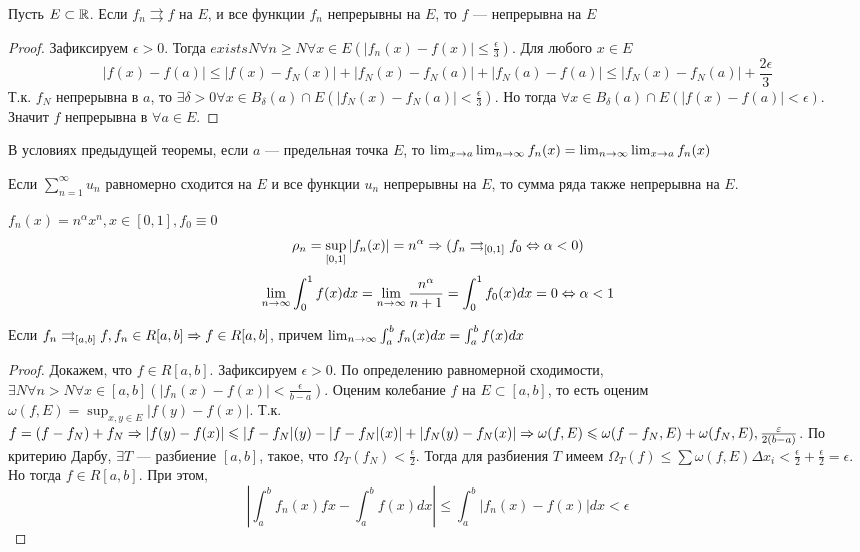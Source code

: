 \begin{theorem}
    Пусть \(E \subset \mathbb{R}\). Если \(f_n \rightrightarrows f\) на \(E\), и все функции \(f_n\) непрерывны на \(E\), то \(f\) --- непрерывна на \(E\)
\end{theorem}
\begin{proof}
    Зафиксируем \(\epsilon > 0\). Тогда \(exists N \forall n \ge N \forall x \in E \left(|f_n(x) - f(x)| \le \frac{\epsilon}{3}\right)\). Для любого \(x \in E\)
    \[|f(x) - f(a)| \le |f(x) - f_N(x)| + |f_N(x) - f_N(a)| + |f_N(a) - f(a)| \le |f_N(x) - f_N(a)| + \frac{2\epsilon}{3}\]
    Т.к. \(f_N\) непрерывна в \(a\), то \(\exists \delta > 0 \forall x \in B_\delta(a) \cap E \left(|f_N(x) - f_N(a)| < \frac{\epsilon}{3}\right)\). Но тогда \(\forall x \in B_\delta(a) \cap E (|f(x) - f(a)| < \epsilon)\). Значит \(f\) непрерывна в \(\forall a \in E\).
\end{proof}

\begin{note}
    В условиях предыдущей теоремы, если \(a\) --- предельная точка \(E\), то \(\lim_{x \rightarrow a}\lim_{n \rightarrow \infty}f_n(x) = \lim_{n \rightarrow \infty}\lim_{x \rightarrow a}f_n(x)\)
\end{note}

\begin{corollary}
    Если \(\sum_{n = 1}^\infty u_n\) равномерно сходится на \(E\) и все функции \(u_n\) непрерывны на \(E\), то сумма ряда также непрерывна на \(E\).
\end{corollary}

\begin{example}
    \(f_n(x) = n^\alpha x^n, x \in [0, 1], f_0 \equiv 0\)
    \[\rho_n = \sup_{[0, 1]}|f_n(x)| = n^\alpha \Rightarrow (f_n \rightrightarrows_{[0, 1]} f_0 \Leftrightarrow \alpha < 0)\]
    \[\lim_{n \rightarrow \infty} \int_0^1 f(x)dx = \lim_{n \rightarrow \infty} \frac{n^\alpha}{n + 1} = \int_0^1 f_0(x)dx = 0 \Leftrightarrow \alpha < 1\]
\end{example}

\begin{theorem}
    Если \(f_n \rightrightarrows_{[a, b]} f, f_n \in R[a, b] \Rightarrow f \in R[a, b]\), причем \(\lim_{n \rightarrow \infty} \int_a^b f_n(x) dx = \int_a^b f(x)dx\)
\end{theorem}
\begin{proof}
    Докажем, что \(f \in R[a, b]\). Зафиксируем \(\epsilon > 0\). По определению равномерной сходимости, \(\exists N \forall n > N \forall x \in [a, b]\left(|f_n(x) - f(x)| < \frac{\epsilon}{b - a}\right)\). Оценим колебание \(f\) на \(E \subset [a, b]\), то есть оценим  \(\omega(f, E) = \sup_{x, y \in E}|f(y) - f(x)|\). Т.к. \(f = (f - f_N) + f_N \Rightarrow |f(y) - f(x)| \leqslant |f - f_N|(y) - |f - f_N|(x)| + |f_N(y) - f_N(x)| \Rightarrow \omega(f, E) \leqslant \omega (f - f_N, E) + \omega (f_N, E), \frac{\varepsilon}{2(b - a)}\). По критерию Дарбу, \(\exists T\) --- разбиение \([a, b]\), такое, что \(\Omega_T(f_N) < \frac{\epsilon}{2}\). Тогда для разбиения \(T\) имеем \(\Omega_T(f) \le \sum \omega(f, E)\Delta x_i < \frac{\epsilon}{2} + \frac{\epsilon}{2} = \epsilon\). Но тогда \(f \in R[a, b]\). При этом,
    \[\left|\int_a^b f_n(x)fx - \int_a^b f(x)dx\right| \le \int_a^b |f_n(x) - f(x)|dx < \epsilon\]
\end{proof}